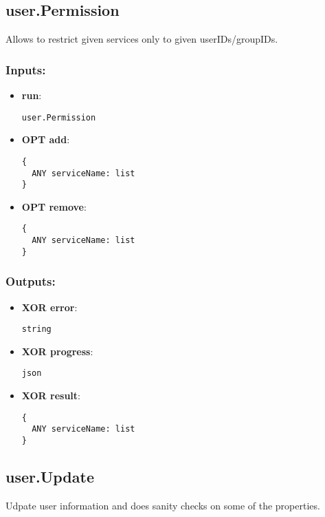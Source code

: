\subsection{user.Permission}
\label{ch:builtinservices:user.Permission}
Allows to restrict given services only to given userIDs/groupIDs.
\subsubsection*{Inputs:}
\begin{itemize}
    \item \textbf{run}: 
\begin{lstlisting}
user.Permission
\end{lstlisting}
    \item \textbf{OPT add}: 
\begin{lstlisting}
{
  ANY serviceName: list
}
\end{lstlisting}
    \item \textbf{OPT remove}: 
\begin{lstlisting}
{
  ANY serviceName: list
}
\end{lstlisting}
  \end{itemize}

\subsubsection*{Outputs:}
\begin{itemize}
    \item \textbf{XOR error}: 
\begin{lstlisting}
string
\end{lstlisting}
    \item \textbf{XOR progress}: 
\begin{lstlisting}
json
\end{lstlisting}
    \item \textbf{XOR result}: 
\begin{lstlisting}
{
  ANY serviceName: list
}
\end{lstlisting}
  \end{itemize}

\subsection{user.Update}
\label{ch:builtinservices:user.Update}
Udpate user information and does sanity checks on some of the properties.
